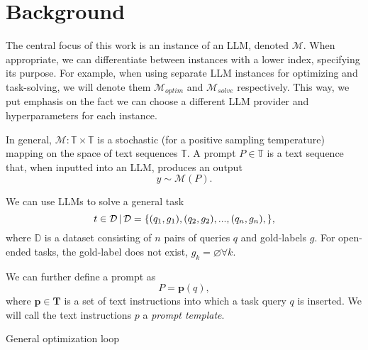 \section{Background}\label{sec:notation}
The central focus of this work is an instance of an LLM, denoted $\mathcal{M}$. 
When appropriate, we can differentiate between instances with a lower index, specifying its purpose. 
For example, when using separate LLM instances for optimizing and task-solving, we will denote them $\mathcal{M}_{optim}$ and $\mathcal{M}_{solve}$ respectively.
This way, we put emphasis on the fact we can choose a different LLM provider and hyperparameters for each instance.


In general, $\mathcal{M}: \mathbb{T} \times \mathbb{T}$ is a stochastic (for a positive sampling temperature) mapping on the space of text sequences $\mathbb{T}$.
A prompt $P \in \mathbb{T}$ is a text sequence that, when inputted into an LLM, produces an output
\begin{equation}
    y \sim \mathcal{M}(P).
\end{equation} 

We can use LLMs to solve a general task
\begin{equation}
    t \in \mathcal{D} \, \vert \, \mathcal{D} = \{ (q_1, g_1), (q_2, g_2), ... , (q_n, g_n), \},
\end{equation}
where $\mathbb{D}$ is a dataset consisting of $n$ pairs of queries $q$ and gold-labels $g$. 
For open-ended tasks, the gold-label does not exist, $g_k = \varnothing \forall k$.


We can further define a prompt as
\begin{equation}
    P = \mathbf{p}(q),
\end{equation}
where $\mathbf{p} \in \mathbf{T}$ is a set of text instructions into which a task query $q$ is inserted. 
We will call the text instructions $p$ a \textit{prompt template}.

\begin{algorithm}
    \caption{General optimization loop}
    \label{alg:genoptimloop}
     
         
    \end{algorithm}
    
